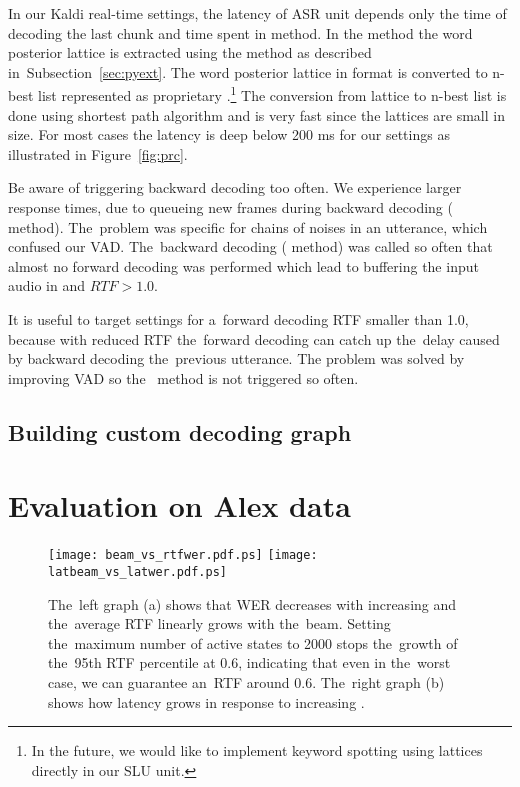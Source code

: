 In our Kaldi real-time settings, the latency of \ac{ASR} unit depends only the time of decoding the last chunk and time spent in  method.
In the  method the word posterior lattice is extracted using the  method as described in~Subsection~\ref{sec:pyext}. 
The word posterior lattice in  format is converted to n-best list represented as proprietary .\footnote{In the future, we would like to implement keyword spotting using lattices directly in our \ac{SLU} unit.}
The conversion from lattice to n-best list is done using  shortest path algorithm and is very fast since the lattices are small in size.
For most cases the latency is deep below 200 ms for our settings as illustrated in Figure~\ref{fig:prc}.


Be aware of triggering backward decoding too often. 
We experience larger response times, due to queueing new frames during backward decoding ( method).
The~problem was specific for chains of noises in an utterance, which confused our \acl{VAD}.
The~backward decoding ( method) was called so often that almost no forward decoding was performed which lead to buffering the input audio in  and $RTF > 1.0$.

It is useful to target settings for a~forward decoding \ac{RTF} smaller than 1.0, because with reduced RTF the~forward decoding can catch up the~delay caused by backward decoding the~previous utterance.
The problem was solved by improving \ac{VAD} so the~ method is not triggered so often.

\subsection{Building custom decoding graph}
\label{sub:hclg}







\section{Evaluation on Alex data}
\label{sec:eval}

\begin{figure*}[t]
    \begin{center}
    \texttt{[image: beam\_vs\_rtfwer.pdf.ps]}
    \texttt{[image: latbeam\_vs\_latwer.pdf.ps]}
    \caption{The~left graph (a) shows that WER decreases with increasing  and the~average RTF linearly grows with the~beam.
    Setting the~maximum number of active states to 2000 stops the~growth of the~95th RTF percentile at 0.6, indicating that even in the~worst case, we can guarantee an~RTF around 0.6.
    The~right graph (b) shows how latency grows in response to increasing .}
    \label{fig:wer} 
    \end{center}
\end{figure*}

